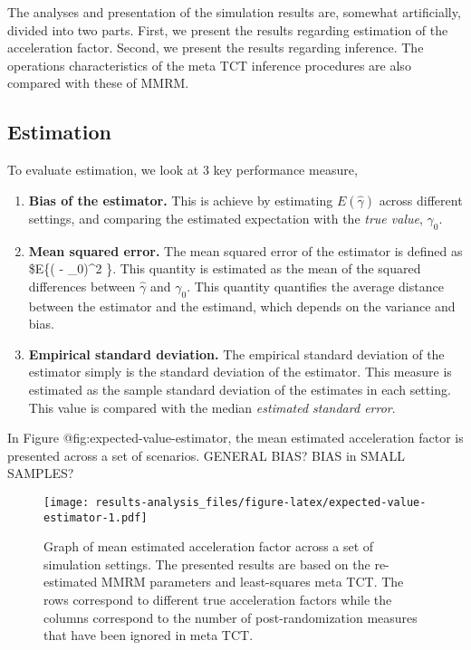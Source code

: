 \documentclass[
]{article}
\providecommand{\tightlist}{%
  \setlength{\itemsep}{0pt}\setlength{\parskip}{0pt}}
\begin{document}
The analyses and presentation of the simulation results are, somewhat
artificially, divided into two parts. First, we present the results regarding
estimation of the acceleration factor. Second, we present the results regarding
inference. The operations characteristics of the meta TCT inference procedures
are also compared with these of MMRM.

\hypertarget{estimation}{%
\subsection{Estimation}\label{estimation}}

To evaluate estimation, we look at 3 key performance measure,

\begin{enumerate}
\def\labelenumi{\arabic{enumi}.}
\tightlist
\item
  \textbf{Bias of the estimator.} This is achieve by estimating \(E(\hat{\gamma})\)
  across different settings, and comparing the estimated expectation with the
  \emph{true value}, \(\gamma_0\).
\item
  \textbf{Mean squared error.} The mean squared error of the estimator is defined as
  \$E\{(\hat{\gamma} - \gamma\_0)\^{}2 \}. This quantity is estimated as the mean of the
  squared differences between \(\hat{\gamma}\) and \(\gamma_0\). This quantity quantifies the average
  distance between the estimator and the estimand, which depends on the variance and
  bias.
\item
  \textbf{Empirical standard deviation.} The empirical standard deviation of the estimator simply
  is the standard deviation of the estimator. This measure is estimated as the sample
  standard deviation of the estimates in each setting. This value is compared with the
  median \emph{estimated standard error}.
\end{enumerate}

In Figure @fig:expected-value-estimator, the mean estimated acceleration factor
is presented across a set of scenarios. GENERAL BIAS? BIAS in SMALL SAMPLES?

\begin{figure}
\centering
\texttt{[image: results-analysis\_files/figure-latex/expected-value-estimator-1.pdf]}
\caption{\label{fig:expected-value-estimator}Graph of mean estimated acceleration factor across a set of simulation settings. The presented results are based on the re-estimated MMRM parameters and least-squares meta TCT. The rows correspond to different true acceleration factors while the columns correspond to the number of post-randomization measures that have been ignored in meta TCT.}
\end{figure}
\end{document}
